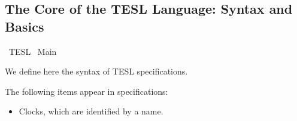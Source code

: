 %
\begin{isabellebody}%
%
%
\begin{isamarkuptext}%
\chapter[Core TESL: Syntax and Basics]{The Core of the TESL Language: Syntax and Basics}%
\end{isamarkuptext}\isamarkuptrue%
%
\isadelimtheory
%
\endisadelimtheory
%
\isatagtheory
{}\isamarkupfalse%
\ TESL\isanewline
{}\ Main\isanewline
\isanewline
{}%
\endisatagtheory
{\isafoldtheory}%
%
\isadelimtheory
%
\endisadelimtheory
%
\isadelimdocument
%
\endisadelimdocument
%
\isatagdocument
%
\isamarkuptrue%
%
\endisatagdocument
{\isafolddocument}%
%
\isadelimdocument
%
\endisadelimdocument
%
\begin{isamarkuptext}%
We define here the syntax of TESL specifications.%
\end{isamarkuptext}\isamarkuptrue%
%
\isadelimdocument
%
\endisadelimdocument
%
\isatagdocument
%
\isamarkuptrue%
%
\endisatagdocument
{\isafolddocument}%
%
\isadelimdocument
%
\endisadelimdocument
%
\begin{isamarkuptext}%
The following items appear in specifications:

%
\begin{itemize}%
\item Clocks, which are identified by a name.


\end{itemize}
\end{isamarkuptext}
\end{isabellebody}
